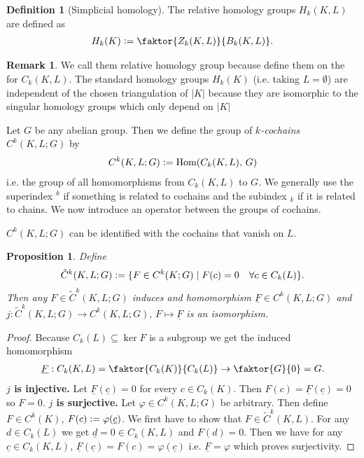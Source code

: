 \documentclass[12pt,a4paper]{article}
\numberwithin{equation}{subsection}
\numberwithin{lemma}{subsection}
\newtheorem{proposition}[lemma]{Proposition}
\theoremstyle{definition}
\newtheorem{definition}[lemma]{Definition}
\newtheorem{remark}[lemma]{Remark}
\begin{document}
\begin{definition}[Simplicial homology]
    The relative homology groups $H_k(K,L)$ are defined as
    \begin{align*}
        H_k(K)\vcentcolon= \faktor{Z_k(K,L)}{B_k(K,L)}.
    \end{align*}
\end{definition}

\begin{remark}
We call them relative homology group because define them on the 
for $C_k(K,L)$.
The standard homology groups $H_k(K)$ (i.e. taking $L = \emptyset$) 
are independent of the chosen triangulation of $|K|$
\cite[p.248]{topology_and_geometry} because they are isomorphic to the 
singular homology groups which only depend on $|K|$ 
\end{remark}

Let $G$ be any abelian group. Then we define the group 
of \textit{$k$-cochains} $C^k(K,L;G)$ by
\begin{align*}
    C^k(K,L;G) \vcentcolon= \text{Hom}(C_k(K,L),\,G)
\end{align*}
i.e. the group of all homomorphisms from $C_k(K,L)$ to $G$. 
We generally use the superindex $^k$ if something is related to 
cochains and the subindex $_k$ if it is related to chains. 
We now introduce an operator between the groups of cochains.

$C^k(K,L;G)$ can be identified with the cochains that vanish on $L$.

\begin{proposition}\label{prop:relative_cochains_vanish}
    Define
    \begin{align*}
        \tilde{C}^k(K,L;G) \vcentcolon= \{ F \in C^k(K;G) 
        \mid F(c) = 0 \quad \forall c \in C_k(L) \}.
    \end{align*}
    Then any $F \in \tilde{C}^k(K,L;G)$ induces and homomorphism
    $\underline{F} \in C^k(K,L;G)$ and $j:\tilde{C}^k(K,L;G) 
    \rightarrow C^k(K,L;G), \, F \mapsto \underline{F}$ is an isomorphism.
\end{proposition}
\begin{proof}
    Because $C_k(L) \subseteq \ker F$ is a subgroup we get the 
    induced homomorphism
    \begin{align*}
        \underline{F}: C_k(K,L) = \faktor{C_k(K)}{C_k(L)} \rightarrow
        \faktor{G}{{0}} = G.
    \end{align*}
    \textbf{$j$ is injective.} Let $\underline{F}(\underline{c})=0$ for every 
    $c \in C_k(K)$. Then $F(c) = \underline{F}(\underline{c}) = 0$ so $F = 0$.
    \textbf{$j$ is surjective.} Let $\varphi \in C^k(K,L;G)$ be arbitrary. 
    Then define $F \in C^k(K)$, $F(c) \vcentcolon= \varphi(\underline{c})$.
    We first have to show that $F \in \tilde{C}^k(K,L)$. For any $d \in C_k(L)$
    we get $\underline{d} = 0 \in C_k(K,L)$ and $F(d) = 0$.
    Then we have for any $\underline{c} \in C_k(K,L)$, 
    $\underline{F}(\underline{c}) = F(c) = \varphi(\underline{c})$ i.e. 
    $\underline{F} = \varphi$ which proves surjectivity.
\end{proof}
\end{document}

